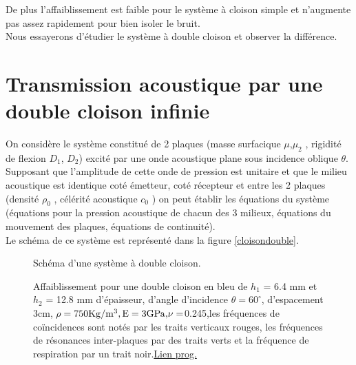 \documentclass[12pt,foolscap]{report}
\begin{document}
	De plus l'affaiblissement est faible pour le système à cloison simple et n'augmente pas assez rapidement pour bien isoler le bruit. \\
	Nous essayerons d'étudier le système à double cloison et observer la différence.\\
	
	
	
	
	\section{Transmission acoustique par une double cloison infinie}
	
	
	On considère le système constitué de 2 plaques (masse surfacique \(\mu \),\(\mu_2 \) , rigidité de flexion $D_1$, $D_2$) excité par une onde acoustique plane sous incidence oblique \(\theta \). Supposant que l'amplitude de cette onde de pression est unitaire et que le milieu acoustique est identique coté émetteur, coté récepteur et entre les 2 plaques (densité \({\rho _0}\) , célérité acoustique \({c_0}\) ) on peut établir les équations du système (équations pour la pression acoustique de chacun des 3 milieux, équations du mouvement des plaques, équations de continuité). \\ 
	Le schéma de ce système est représenté dans la figure \ref{cloisondouble}. \\
	\begin{figure}
		\begin{minipage}[c]{.45\linewidth}
			\begin{center}
				\caption{Schéma d'une système à double cloison.}
				\label{cloisondouble}
			\end{center}
		\end{minipage}
		\hfill
		\begin{minipage}[c]{.45\linewidth}
			\begin{center}
				\caption{Affaiblissement pour une double cloison en bleu de $h_1$ = 6.4 mm et $h_{2}$ = 12.8 mm d'épaisseur, d'angle d'incidence $\theta  = 60^\circ $, d'espacement 3cm, $\rho  = 750 {\rm{Kg/}}{{\rm{m}}^3},{\rm{E = 3}}{\rm{GPa, }} \nu = $0.245,les fréquences de coïncidences sont notés par les traits verticaux rouges, les fréquences de résonances inter-plaques par des traits verts et la fréquence de respiration par un trait noir.\href{https://github.com/Nuopel/Encoffrement/blob/master/Programme/doublecloison.m}{Lien prog.}}
				\label{w}
			\end{center}
		\end{minipage}
	\end{figure}	
	
\end{document}
